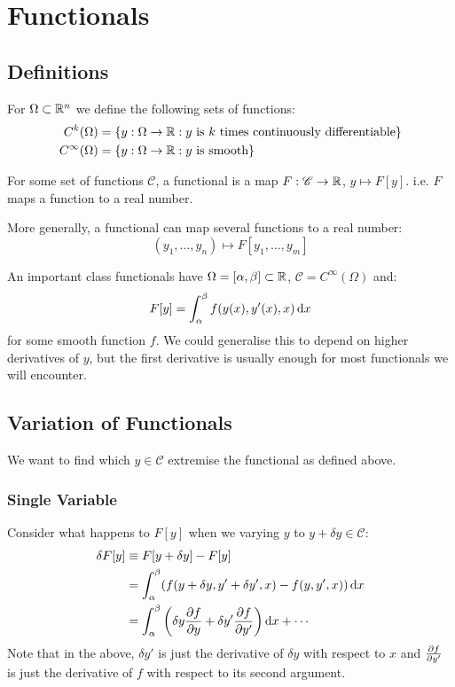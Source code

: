 \documentclass[../main.tex]{subfiles}
\begin{document}
\chapter{Functionals}
\section{Definitions}
\begin{remark}
  For $\Omega \subset \mathbb{R}^{n}$ we define the following sets of functions:
  \begin{align*}
    C^{k}(\Omega) &= \{y: \Omega \to \mathbb{R}: \text{$y$ is $k$ times continuously differentiable}\} \\
    C^{\infty}(\Omega) &= \{y: \Omega \to \mathbb{R}: \text{$y$ is smooth}\}
  \end{align*}
\end{remark}
\begin{definition}[Functional]
  For some set of functions $\mathscr{C}$, a functional is a map $F: \mathscr{C} \to \mathbb{R}$, $y \mapsto F[y]$.
  i.e. $F$ maps a function to a real number.

  More generally, a functional can map several functions to a real number:
  \[
    (y_1, \ldots, y_n) \mapsto F[y_1, \ldots, y_m]
  \]
\end{definition}
An important class functionals have $\Omega = [\alpha, \beta] \subset \mathbb{R}$, $\mathscr{C} = C^{\infty}(\Omega)$ and:
\begin{equation}
  F[y] = \int_{\alpha}^{\beta} f(y(x), y'(x), x) \d{x} \label{genFunct}
\end{equation}
for some smooth function $f$.
We could generalise this to depend on higher derivatives of $y$, but the first derivative is usually enough for most functionals we will encounter.
\section{Variation of Functionals}
We want to find which $y \in \mathscr{C}$ extremise the functional as defined above.
\subsection{Single Variable}
Consider what happens to $F[y]$ when we varying $y$ to $y + \delta y \in \mathscr{C}$:
\begin{align*}
  \delta F[y] &\equiv F[y + \delta y] - F[y] \\
              &= \int_{\alpha}^{\beta} (f(y + \delta y, y' + \delta y', x) - f(y, y', x)) \d{x} \\
              &= \int_{\alpha}^{\beta} \left(\delta y \pderiv{f}{y} + \delta y' \pderiv{f}{y'}\right) \d{x} + \cdots \\
\end{align*}
Note that in the above, $\delta y'$ is just the derivative of $\delta y$ with respect to $x$ and $\pderiv{f}{y'}$ is just the derivative of $f$ with respect to its second argument.
\end{document}
